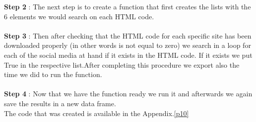 \documentclass{book}
\begin{document}
\textbf{Step 2} : The next step is to create a function that first creates the lists with the 6 elements we would search on each HTML code. \\\\
\textbf{Step 3} : Then after checking that the HTML code for each specific site has been downloaded properly (in other words is not equal to zero) we search in a loop for each of the social media at hand if it exists in the HTML code. If it exists we put True in the respective list.After completing this procedure we export also the time we did to run the function.\\\\
\textbf{Step 4} : Now that we have the function ready we run it and afterwards we again save the results in a new data frame.\\
The code that was created is available in the Appendix.\ref{p10}
\end{document}
